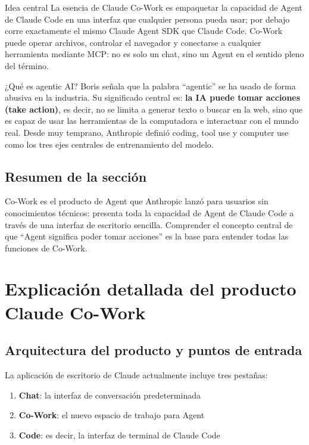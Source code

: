 \documentclass[a4paper]{article}
\begin{document}
\begin{importantbox}{Idea central}
La esencia de Claude Co-Work es empaquetar la capacidad de Agent de Claude Code en una interfaz que cualquier persona pueda usar; por debajo corre exactamente el mismo Claude Agent SDK que Claude Code. Co-Work puede operar archivos, controlar el navegador y conectarse a cualquier herramienta mediante MCP: no es solo un chat, sino un Agent en el sentido pleno del término.
\end{importantbox}

\begin{knowledgebox}{¿Qué es agentic AI?}
Boris señala que la palabra ``agentic'' se ha usado de forma abusiva en la industria. Su significado central es: \textbf{la IA puede tomar acciones (take action)}, es decir, no se limita a generar texto o buscar en la web, sino que es capaz de usar las herramientas de la computadora e interactuar con el mundo real. Desde muy temprano, Anthropic definió coding, tool use y computer use como los tres ejes centrales de entrenamiento del modelo.
\end{knowledgebox}

\subsection{Resumen de la sección}

Co-Work es el producto de Agent que Anthropic lanzó para usuarios sin conocimientos técnicos: presenta toda la capacidad de Agent de Claude Code a través de una interfaz de escritorio sencilla. Comprender el concepto central de que ``Agent significa poder tomar acciones'' es la base para entender todas las funciones de Co-Work.

\section{Explicación detallada del producto Claude Co-Work}

\subsection{Arquitectura del producto y puntos de entrada}

La aplicación de escritorio de Claude actualmente incluye tres pestañas:

\begin{enumerate}
    \item \textbf{Chat}: la interfaz de conversación predeterminada
    \item \textbf{Co-Work}: el nuevo espacio de trabajo para Agent
    \item \textbf{Code}: es decir, la interfaz de terminal de Claude Code
\end{enumerate}
\end{document}
